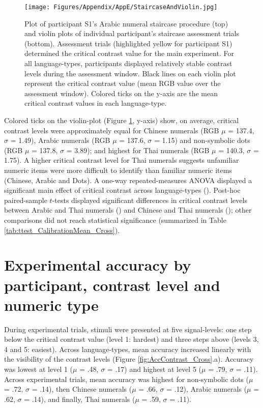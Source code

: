 \begin{figure}[tbh]
\centering \texttt{[image: Figures/Appendix/AppE/StaircaseAndViolin.jpg]}
\caption{Plot of participant S1's Arabic numeral staircase procedure (top) and violin plots of individual participant's staircase assessment trials (bottom). Assessment trials (highlighted yellow for participant S1) determined the critical contrast value for the main experiment. For all language-types, participants displayed relatively stable contrast levels during the assessment window. Black lines on each violin plot represent the critical contrast value (mean RGB value over the assessment window). Colored ticks on the y-axis are the mean critical contrast values in each language-type.}
\label{fig:Staircase_Cross}
\end{figure}

Colored ticks on the violin-plot (Figure \ref{fig:Staircase_Cross}, y-axis) show, on average, critical contrast levels were approximately equal for Chinese numerals (RGB $\mu$ = 137.4, $\sigma$ = 1.49), Arabic numerals (RGB $\mu$ = 137.6, $\sigma$ = 1.15) and non-symbolic dots (RGB $\mu$ = 137.8, $\sigma$ = 3.89); and highest for Thai numerals (RGB $\mu$ = 140.3, $\sigma$ = 1.75). A higher critical contrast level for Thai numerals suggests unfamiliar numeric items were more difficult to identify than familiar numeric items (Chinese, Arabic and Dots). A one-way repeated-measures ANOVA displayed a significant main effect of critical contrast across language-types (). Post-hoc paired-sample $t$-tests displayed significant differences in critical contrast levels between Arabic and Thai numerals () and Chinese and Thai numerals (); other comparisons did not reach statistical significance (summarized in Table \ref{tab:ttest_CalibrationMean_Cross}). 


\section{Experimental accuracy by participant, contrast level and numeric type}
\label{Appendix:Accuracy}
During experimental trials, stimuli were presented at five signal-levels: one step below the critical contrast value (level 1: hardest) and three steps above (levels 3, 4 and 5: easiest). Across language-types, mean accuracy increased linearly with the visibility of the contrast levels (Figure \ref{fig:AccContrast_Cross}.a). Accuracy was lowest at level 1 ($\mu$ = .48, $\sigma$ = .17) and highest at level 5 ($\mu$ = .79, $\sigma$ = .11). Across experimental trials, mean accuracy was highest for non-symbolic dots ($\mu$ = .72, $\sigma$ = .14), then Chinese numerals ($\mu$ = .66, $\sigma$ = .12), Arabic numerals ($\mu$ = .62, $\sigma$ = .14), and finally, Thai numerals ($\mu$ = .59, $\sigma$ = .11).

